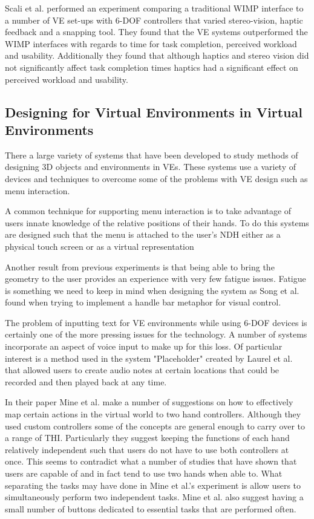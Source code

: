 \documentclass{sig-alternate-05-2015}
\begin{document}
 Scali et al. performed an experiment comparing a traditional WIMP interface to a number of VE set-ups with 6-DOF controllers that varied stereo-vision, haptic feedback and a snapping tool\cite{Scali2003}. They found that the VE systems outperformed the WIMP interfaces with regards to time for task completion, perceived workload and usability. Additionally they found that although haptics and stereo vision did not significantly affect task completion times haptics had a significant effect on perceived workload and usability.
\subsection{Designing for Virtual Environments in Virtual Environments}
There a large variety of systems that have been developed to study methods of designing 3D objects and environments in VEs. These systems use a variety of devices and techniques to overcome some of the problems with VE design such as menu interaction.

A common technique for supporting menu interaction is to take advantage of users innate knowledge of the relative positions of their hands\cite{Bowman1998, Buxton1986}. To do this systems are designed such that the menu is attached to the user's NDH either as a physical touch screen\cite{Wang2013,Mine2014} or as a virtual representation\cite{Jerald2013}

Another result from previous experiments is that being able to bring the geometry to the user provides an experience with very few fatigue issues\cite{Jerald2013}. Fatigue is something we need to keep in mind when designing the system as Song et al. found when trying to implement a handle bar metaphor for visual control\cite{Song2012}.

The problem of inputting text for VE environments while using 6-DOF devices is certainly one of the more pressing issues for the technology. A number of systems incorporate an aspect of voice input to make up for this loss\cite{Ponto2013,Toma2012}. Of particular interest is a method used in the system "Placeholder" created by Laurel et al. that allowed users to create audio notes at certain locations that could be recorded and then played back at any time\cite{Laurel1994}.

In their paper Mine et al. make a number of suggestions on how to effectively map certain actions in the virtual world to two hand controllers\cite{Mine2014}. Although they used custom controllers some of the concepts are general enough to carry over to a range of THI. Particularly they suggest keeping the functions of each hand relatively independent such that users do not have to use both controllers at once. This seems to contradict what a number of studies that have shown that users are capable of and in fact tend to use two hands when able to\cite{Buxton1986,Hinckley1994}. What separating the tasks may have done in Mine et al.'s experiment is allow users to simultaneously perform two independent tasks.  Mine et al. also suggest having a small number of buttons dedicated to essential tasks that are performed often\cite{Mine2014}.
\end{document}
